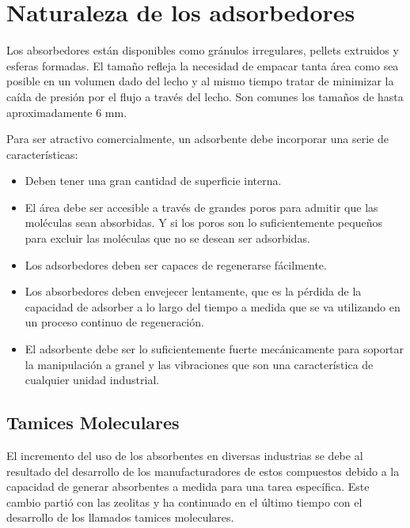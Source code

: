 \documentclass[11pt]{book}
\begin{document}
\section{Naturaleza de los adsorbedores}

Los absorbedores están disponibles como gránulos irregulares, pellets extruidos y esferas formadas. El tamaño refleja la necesidad de empacar tanta área como sea posible en un volumen dado del lecho y al mismo tiempo tratar de minimizar la caída de presión por el flujo a través del lecho. Son comunes los tamaños de hasta aproximadamente 6 mm.

Para ser atractivo comercialmente, un adsorbente debe incorporar una serie de características:

\begin{itemize}
    \item Deben tener una gran cantidad de superficie interna.

    \item El área debe ser accesible a través de grandes poros para admitir que las moléculas sean absorbidas. Y si los poros son lo suficientemente pequeños para excluir las moléculas que no se desean ser adsorbidas.
    
    \item Los adsorbedores deben ser capaces de regenerarse fácilmente.

    \item Los absorbedores deben envejecer lentamente, que es la pérdida de la capacidad de adsorber a lo largo del tiempo a medida que se va utilizando en un proceso continuo de regeneración.

    \item El adsorbente debe ser lo suficientemente fuerte mecánicamente para soportar la manipulación a granel y las vibraciones que son una característica de cualquier unidad industrial.

\end{itemize}

\subsection{Tamices Moleculares}

El incremento del uso de los absorbentes en diversas industrias se debe al resultado del desarrollo de los manufacturadores de estos compuestos debido a la capacidad de generar absorbentes a medida para una tarea específica. Este cambio partió con las zeolitas y ha continuado en el último tiempo con el desarrollo de los llamados tamices moleculares.
\end{document}
